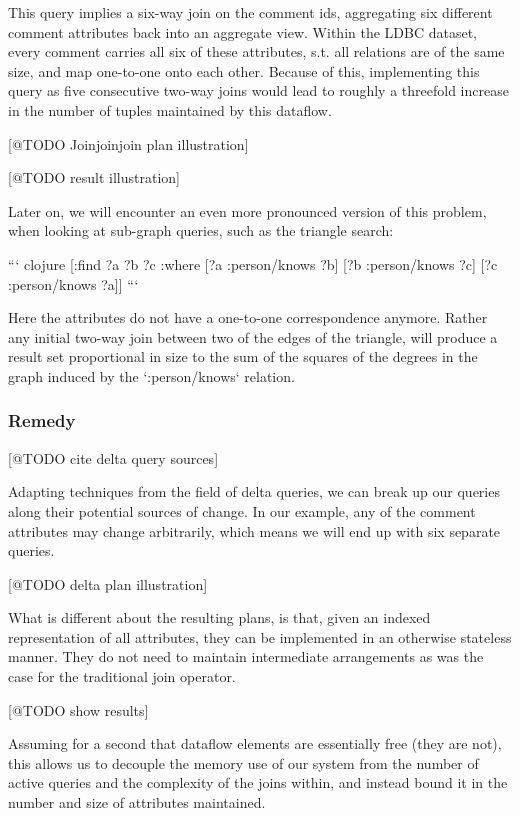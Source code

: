 \documentclass[../catalog.tex]{subfiles}
\begin{document}
This query implies a six-way join on the comment ids, aggregating six
different comment attributes back into an aggregate view. Within the
LDBC dataset, every comment carries all six of these attributes,
s.t. all relations are of the same size, and map one-to-one onto each
other. Because of this, implementing this query as five consecutive
two-way joins would lead to roughly a threefold increase in the number
of tuples maintained by this dataflow.

[@TODO Joinjoinjoin plan illustration]

[@TODO result illustration]

Later on, we will encounter an even more pronounced version of this
problem, when looking at sub-graph queries, such as the triangle
search:

``` clojure
[:find ?a ?b ?c
 :where
 [?a :person/knows ?b]
 [?b :person/knows ?c]
 [?c :person/knows ?a]]
```

Here the attributes do not have a one-to-one correspondence
anymore. Rather any initial two-way join between two of the edges of
the triangle, will produce a result set proportional in size to the
sum of the squares of the degrees in the graph induced by the
`:person/knows` relation.

\subsubsection{Remedy}

[@TODO cite delta query sources]

Adapting techniques from the field of delta queries, we can break up
our queries along their potential sources of change. In our example,
any of the comment attributes may change arbitrarily, which means we
will end up with six separate queries.

[@TODO delta plan illustration]

What is different about the resulting plans, is that, given an indexed
representation of all attributes, they can be implemented in an
otherwise stateless manner. They do not need to maintain intermediate
arrangements as was the case for the traditional join operator.

[@TODO show results]

Assuming for a second that dataflow elements are essentially free
(they are not), this allows us to decouple the memory use of our
system from the number of active queries and the complexity of the
joins within, and instead bound it in the number and size of
attributes maintained.
\end{document}
